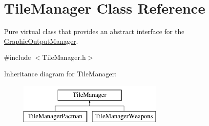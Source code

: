 \hypertarget{class_tile_manager}{}\section{Tile\+Manager Class Reference}
\label{class_tile_manager}


Pure virtual class that provides an abstract interface for the \mbox{\hyperlink{class_graphic_output_manager}{Graphic\+Output\+Manager}}.  




{\ttfamily \#include $<$Tile\+Manager.\+h$>$}

Inheritance diagram for Tile\+Manager\+:\begin{figure}[H]
\begin{center}
\leavevmode
\includegraphics[height=2.000000cm]{class_tile_manager}
\end{center}
\end{figure}
